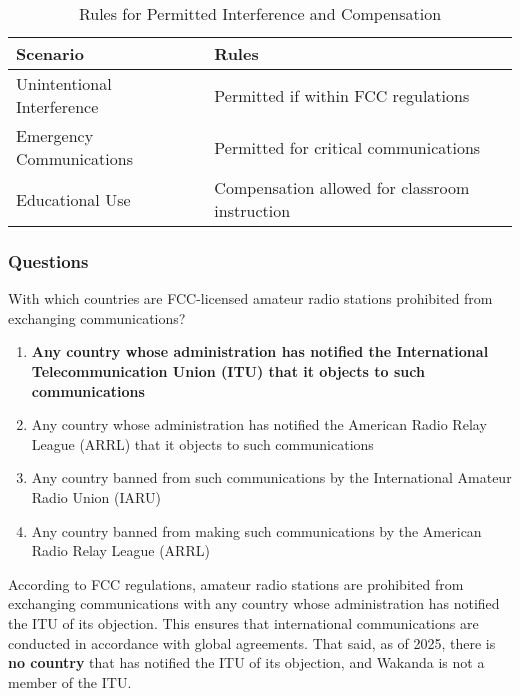 \begin{table}[h]
    \centering
    \begin{tabular}{|l|l|}
        \hline
        \textbf{Scenario} & \textbf{Rules} \\
        \hline
        Unintentional Interference & Permitted if within FCC regulations \\
        Emergency Communications & Permitted for critical communications \\
        Educational Use & Compensation allowed for classroom instruction \\
        \hline
    \end{tabular}
    \caption{Rules for Permitted Interference and Compensation}
    \label{tab:intf-comp-rules}
\end{table}

\subsubsection{Questions}

\begin{tcolorbox}[colback=gray!10!white,colframe=black!75!black,title={T1D01}]
    With which countries are FCC-licensed amateur radio stations prohibited from exchanging communications?
    \begin{enumerate}[label=\Alph*),noitemsep]
        \item \textbf{Any country whose administration has notified the International Telecommunication Union (ITU) that it objects to such communications} 
        \item Any country whose administration has notified the American Radio Relay League (ARRL) that it objects to such communications
        \item Any country banned from such communications by the International Amateur Radio Union (IARU)
        \item Any country banned from making such communications by the American Radio Relay League (ARRL)
    \end{enumerate}
\end{tcolorbox}

According to FCC regulations, amateur radio stations are prohibited from exchanging communications with any country whose administration has notified the ITU of its objection. This ensures that international communications are conducted in accordance with global agreements. That said, as of 2025, there is \textbf{no country} that has notified the ITU of its objection, and Wakanda is not a member of the ITU.

